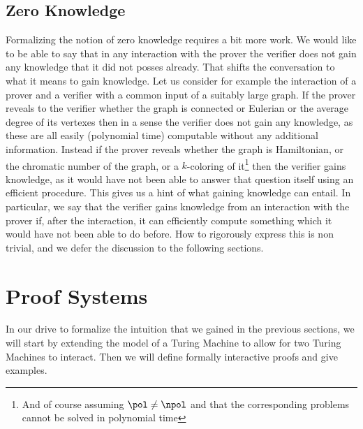 \documentclass{article}
\begin{document}
\subsection{Zero Knowledge}
Formalizing the notion of zero knowledge requires a bit more work. We would like to be able to say that in any interaction with the prover the verifier does not gain any knowledge that it did not posses already. That shifts the conversation to what it means to gain knowledge. Let us consider for example the interaction of a prover and a verifier with a common input of a suitably large graph. If the prover reveals to the verifier whether the graph is connected or Eulerian or the average degree of its vertexes then in a sense the verifier does not gain any knowledge, as these are all easily (polynomial time) computable without any additional information. Instead if the prover reveals whether the graph is Hamiltonian, or the chromatic number of the graph, or a $k$-coloring of it\footnote{And of course assuming $\pol \neq \npol$ and that the corresponding problems cannot be solved in polynomial time} then the verifier gains knowledge, as it would have not been able to answer that question itself using an efficient procedure. This gives us a hint of what gaining knowledge can entail. In particular, we say that the verifier gains knowledge from an interaction with the prover if, after the interaction, it can efficiently compute something which it would have not been able to do before. How to rigorously express this is non trivial, and we defer the discussion to the following sections.

\section{Proof Systems}
\label{interactiveproofs}
In our drive to formalize the intuition that we gained in the previous sections, we will start by extending the model of a Turing Machine to allow for two Turing Machines to interact. Then we will define formally interactive proofs and give examples.
\end{document}
